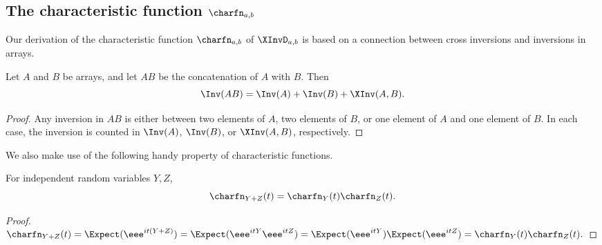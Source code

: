 \subsection{The characteristic function \texorpdfstring{$\charfn_{a,b}$}{phi a,b}}
\label{sec:characteristic}

Our derivation of the characteristic function $\charfn_{a,b}$ of $\XInvD_{a,b}$ is based on a connection between cross inversions and inversions in arrays.
\begin{fact}
    \label{fact:cross-inversion-property}
    Let $A$ and $B$ be arrays, and let $AB$ be the concatenation of $A$ with $B$. Then
    \[\Inv(AB)=\Inv(A)+\Inv(B)+\XInv(A,B). \]
\end{fact}
\begin{proof}
    Any inversion in $AB$ is either between two elements of $A$, two elements of $B$, or one element of $A$ and one element of $B$. In each case, the inversion is counted in $\Inv(A)$, $\Inv(B)$, or $\XInv(A,B)$, respectively.
\end{proof}

We also make use of the following handy property of characteristic functions.
\begin{fact}
    \label{fact:charfn-mult}
    For independent random variables $Y,Z$,
    \[\charfn_{Y+Z}(t)=\charfn_Y(t)\charfn_Z(t). \]
\end{fact}
\begin{proof}
%
\quad
$ \charfn_{Y+Z}(t)=\Expect(\eee^{it(Y+Z)})=\Expect(\eee^{itY}\eee^{itZ})=\Expect(\eee^{itY})\Expect(\eee^{itZ})=\charfn_Y(t)\charfn_Z(t). $   %
\end{proof}
%


